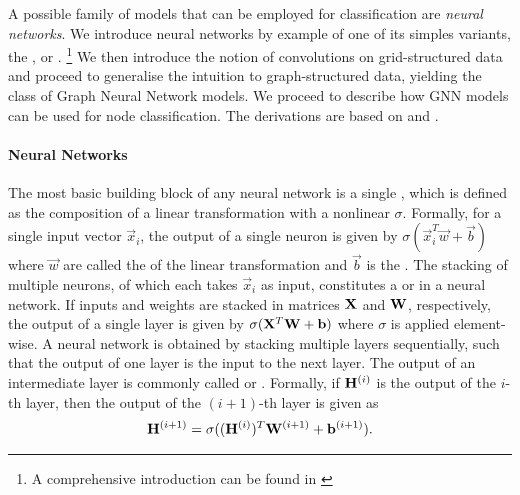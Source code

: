 \documentclass[
	fontsize=10pt, %
	twoside=false, %
	secnumdepth=1, %
  toc=indentunnumbered %
]{kaobook}
\begin{document}

A possible family of models that can be employed for classification are
\textit{neural networks}. We introduce neural networks by example of one of its
simples variants, the , or .
\footnote{A comprehensive introduction can be found in
  \citeauthor{zhang_dive_nodate} \cite{zhang_dive_nodate}
}
We then introduce the notion of convolutions on grid-structured data and
proceed to generalise the intuition to graph-structured data, yielding the class
of Graph Neural Network models. We proceed to describe how GNN models can be
used for node classification. The derivations are based on 
\citeauthor{zhang_dive_nodate} \cite{zhang_dive_nodate}
and
\citeauthor{bronstein_geometric_2021} \cite{bronstein_geometric_2021}.


\paragraph{Neural Networks}

The most basic building block of any neural network is a single
, which is defined as the composition of a linear transformation with
a nonlinear  $\sigma$. Formally, for a single input
vector $\vec x_i$, the output of a single neuron is given by $\sigma(\vec x_i^T
\vec w + \vec b)$ where $\vec w$ are called the  of the linear
transformation and $\vec b$ is the . The stacking of multiple neurons,
of which each takes $\vec x_i$ as input, constitutes a  or
  in a neural network. If inputs and weights are stacked
in matrices $\mathbf{X}$ and $\mathbf{W}$, respectively, the output of a single layer is
given by $\sigma(\mathbf{X}^T \mathbf{W} + \mathbf{b})$ where $\sigma$ is applied
element-wise.
%
A neural network is obtained by stacking multiple layers sequentially, such that
the output of one layer is the input to the next layer. The output of an
intermediate layer is commonly called  or 
. Formally, if $\mathbf{H}^{(i)}$ is the output of the $i$-th layer,
then the output of the $(i+1)$-th layer is given as
\begin{align}
\mathbf{H}^{(i+1)} = \sigma((\mathbf{H}^{(i)})^T \mathbf{W}^{(i+1)} + \mathbf{b}^{(i+1)}).
\label{eq:fully-connected}
\end{align}
%
\end{document}
